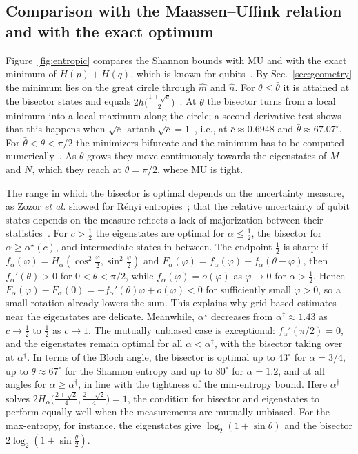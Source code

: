 \documentclass[aps,pra,twocolumn,superscriptaddress,nofootinbib,floatfix]{revtex4-2}
\theoremstyle{definition}
\DeclareMathOperator{\artanh}{artanh}
\newcommand{\mhat}{\hat m}
\newcommand{\nhat}{\hat n}
\newcommand{\sqc}{\sqrt{c}}
\begin{document}
\subsection{Comparison with the Maassen--Uffink relation and with the exact optimum}

Figure~\ref{fig:entropic} compares the Shannon bounds with MU and with the
exact minimum of $H(p)+H(q)$, which is known for
qubits~\cite{SanchezRuiz1998,Ghirardi2003}. By Sec.~\ref{sec:geometry} the
minimum lies on the great circle through $\mhat$ and $\nhat$. For
$\theta\le\bar\theta$ it is attained at the bisector states and equals
$2h\bigl(\frac{1+\sqc}{2}\bigr)$~\cite{Ghirardi2003}. At $\bar\theta$ the
bisector turns from a local minimum into a local maximum along the circle; a
second-derivative test shows that this happens when
$\sqrt{\bar c}\,\artanh\sqrt{\bar c}=1$~\cite{Bosyk2011}, i.e., at $\bar c\approx0.6948$ and
$\bar\theta\approx67.07^\circ$. For $\bar\theta<\theta<\pi/2$ the minimizers
bifurcate and the minimum has to be computed numerically~\cite{Ghirardi2003}.
As $\theta$ grows they move continuously towards the eigenstates of $M$ and
$N$, which they reach at $\theta=\pi/2$, where MU is tight.

The range in which the bisector is optimal depends on the uncertainty measure,
as Zozor \emph{et al.} showed for R\'enyi
entropies~\cite{ZozorBosykPortesi2013}; that the relative uncertainty of qubit
states depends on the measure reflects a lack of majorization between their
statistics~\cite{LuisBosykPortesi2016}.
For $c>\frac12$ the eigenstates are optimal for $\alpha\le\frac12$, the
bisector for $\alpha\ge\alpha^\star(c)$, and intermediate states in between.
The endpoint $\frac12$ is sharp: if $f_\alpha(\varphi)=H_\alpha(\cos^2\frac\varphi2,
\sin^2\frac\varphi2)$ and $F_\alpha(\varphi)=f_\alpha(\varphi)+f_\alpha(\theta-\varphi)$,
then $f_\alpha'(\theta)>0$ for $0<\theta<\pi/2$, while $f_\alpha(\varphi)=o(\varphi)$
as $\varphi\to0$ for $\alpha>\frac12$. Hence
$F_\alpha(\varphi)-F_\alpha(0)=-f_\alpha'(\theta)\varphi+o(\varphi)<0$ for
sufficiently small $\varphi>0$, so a small rotation already lowers the sum. This
explains why grid-based estimates near the eigenstates are delicate. Meanwhile,
$\alpha^\star$ decreases from $\alpha^\dagger\approx1.43$ as $c\to\frac12$ to
$\frac12$ as $c\to1$. The mutually unbiased case is exceptional: $f_\alpha'(\pi/2)=0$,
and the eigenstates remain optimal for all $\alpha<\alpha^\dagger$, with the
bisector taking over at $\alpha^\dagger$. In terms of the Bloch angle, the bisector
is optimal up to $43^\circ$ for $\alpha=3/4$, up to $\bar\theta\approx67^\circ$
for the Shannon entropy and up to $80^\circ$ for $\alpha=1.2$, and at all angles
for $\alpha\ge\alpha^\dagger$, in line with the tightness of the min-entropy
bound. Here $\alpha^\dagger$ solves
$2H_\alpha\bigl(\frac{2+\sqrt2}{4},\frac{2-\sqrt2}{4}\bigr)=1$, the condition for
bisector and eigenstates to perform equally well when the measurements are
mutually unbiased. For the max-entropy, for instance, the eigenstates give
$\log_2(1+\sin\theta)$ and the bisector $2\log_2(1+\sin\frac\theta2)$.
\end{document}
